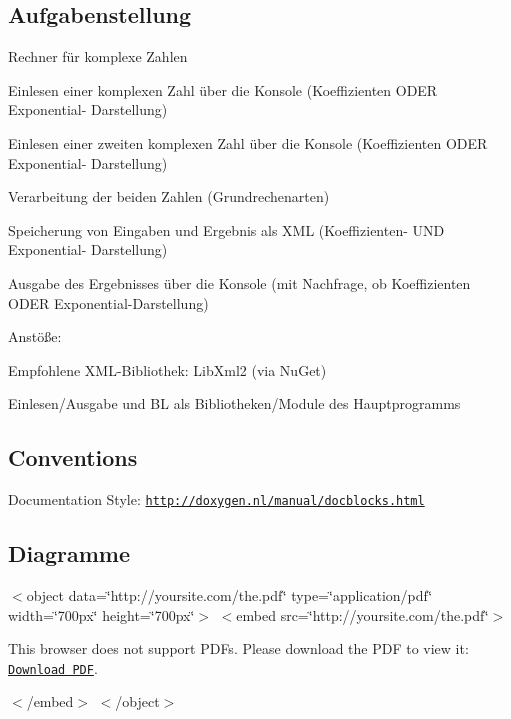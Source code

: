 \subsection*{Aufgabenstellung}

Rechner für komplexe Zahlen
\begin{DoxyItemize}
\item Einlesen einer komplexen Zahl über die Konsole (Koeffizienten O\+D\+ER Exponential-\/ Darstellung)
\item Einlesen einer zweiten komplexen Zahl über die Konsole (Koeffizienten O\+D\+ER Exponential-\/ Darstellung)
\item Verarbeitung der beiden Zahlen (Grundrechenarten)
\item Speicherung von Eingaben und Ergebnis als X\+ML (Koeffizienten-\/ U\+ND Exponential-\/ Darstellung)
\item Ausgabe des Ergebnisses über die Konsole (mit Nachfrage, ob Koeffizienten O\+D\+ER Exponential-\/\+Darstellung)
\end{DoxyItemize}

Anstöße\+:
\begin{DoxyItemize}
\item Empfohlene X\+M\+L-\/\+Bibliothek\+: Lib\+Xml2 (via Nu\+Get)
\item Einlesen/\+Ausgabe und BL als Bibliotheken/\+Module des Hauptprogramms
\end{DoxyItemize}

\subsection*{Conventions}

Documentation Style\+: \href{http://doxygen.nl/manual/docblocks.html}{\tt http\+://doxygen.\+nl/manual/docblocks.\+html}

\subsection*{Diagramme}

$<$object data=\char`\"{}http\+://yoursite.\+com/the.\+pdf\char`\"{} type=\char`\"{}application/pdf\char`\"{} width=\char`\"{}700px\char`\"{} height=\char`\"{}700px\char`\"{}$>$ $<$embed src=\char`\"{}http\+://yoursite.\+com/the.\+pdf\char`\"{}$>$ 

This browser does not support P\+D\+Fs. Please download the P\+DF to view it\+: \href{http://yoursite.com/the.pdf}{\tt Download P\+DF}.

$<$/embed$>$ $<$/object$>$

